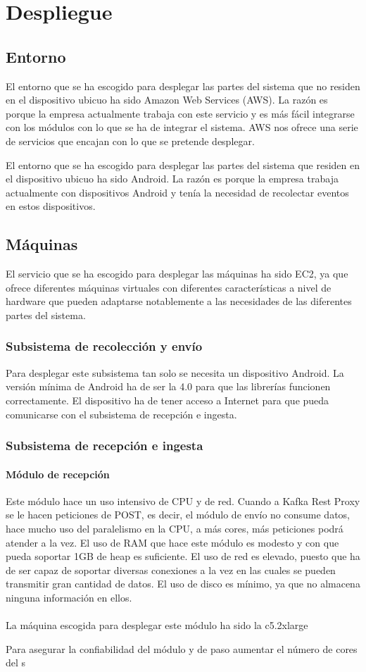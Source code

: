 \chapter{Despliegue}
\section{Entorno}
El entorno que se ha escogido para desplegar las partes del sistema que no residen en el dispositivo ubicuo ha sido Amazon Web Services (AWS). La razón es porque la empresa actualmente trabaja con este servicio y es más fácil integrarse con los módulos con lo que se ha de integrar el sistema. AWS nos ofrece una serie de servicios que encajan con lo que se pretende desplegar.

El entorno que se ha escogido para desplegar las partes del sistema que residen en el dispositivo ubicuo ha sido Android. La razón es porque la empresa trabaja actualmente con dispositivos Android y tenía la necesidad de recolectar eventos en estos dispositivos.

\section{Máquinas}
El servicio que se ha escogido para desplegar las máquinas ha sido EC2\cite{Tfg:ec2}, ya que ofrece diferentes máquinas virtuales con diferentes características a nivel de hardware que pueden adaptarse notablemente a las necesidades de las diferentes partes del sistema.

\subsection{Subsistema de recolección y envío}
Para desplegar este subsistema tan solo se necesita un dispositivo Android. La versión mínima de Android ha de ser la 4.0 para que las librerías funcionen correctamente. El dispositivo ha de tener acceso a Internet para que pueda comunicarse con el subsistema de recepción e ingesta.

\subsection{Subsistema de recepción e ingesta}
\subsubsection{Módulo de recepción}
Este módulo hace un uso intensivo de CPU y de red. Cuando a Kafka Rest Proxy se le hacen peticiones de POST, es decir, el módulo de envío no consume datos, hace mucho uso del paralelismo en la CPU, a más cores, más peticiones podrá atender a la vez. El uso de RAM que hace este módulo es modesto y con que pueda soportar 1GB de heap es suficiente. El uso de red es elevado, puesto que ha de ser capaz de soportar diversas conexiones a la vez en las cuales se pueden transmitir gran cantidad de datos. El uso de disco es mínimo, ya que no almacena ninguna información en ellos.
\\\\

La máquina escogida para desplegar este módulo ha sido la c5.2xlarge

Para asegurar la confiabilidad del módulo y de paso aumentar el número de cores del s